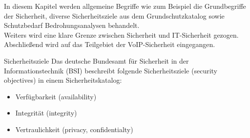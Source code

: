 \label{Grundlagen der IT-Sicherheit}
 In diesem Kapitel werden allgemeine Begriffe wie zum Beispiel die Grundbegriffe der
 Sicherheit, diverse Sicherheitsziele aus dem Grundschutzkatalog sowie Schutzbedarf 
 Bedrohungsanalysen behandelt. 
 \\
 Weiters wird eine klare Grenze zwischen Sicherheit und IT-Sicherheit gezogen. 
 Abschließend wird auf das Teilgebiet der VoIP-Sicherheit eingegangen.
 \\

 \label{Sicherheitsziele}
 \begin{section}{Sicherheitsziele}
  Das deutsche Bundesamt für Sicherheit in der Informationstechnik (BSI) beschreibt 
  folgende Sicherheitsziele (security objectives) in einem Sicherheitskatalog: 
  \cite{BSIBedarf}
  \begin{itemize}
   \item Verfügbarkeit (availability)
   \item Integrität (integrity)
   \item Vertraulichkeit (privacy, confidentialty)
  \end{itemize}
  \pagebreak

   \DIFdelbegin %


\end{section}
